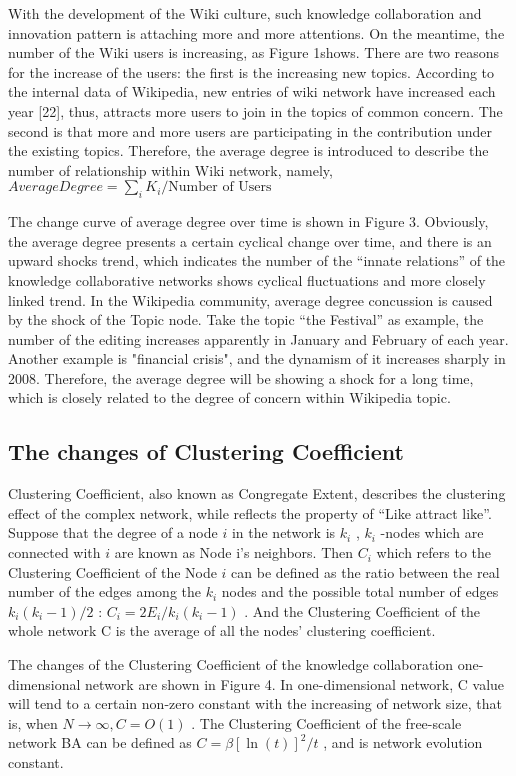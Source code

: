 \documentclass{elsarticle}
\begin{document}
With the development of the Wiki culture, such knowledge collaboration
and innovation pattern is attaching more and more attentions. On the
meantime, the number of the Wiki users is increasing, as Figure
1shows. There are two reasons for the increase of the users: the first
is the increasing new topics. According to the internal data of
Wikipedia, new entries of wiki network have increased each year [22],
thus, attracts more users to join in the topics of common concern. The
second is that more and more users are participating in the
contribution under the existing topics. Therefore, the average degree
is introduced to describe the number of relationship within Wiki
network, namely,$AverageDegree = \sum_iK_i/\text{Number of Users}$

The change curve of average degree over time is shown in Figure 3. Obviously, the average degree presents a certain cyclical change over time, and there is an upward shocks trend, which indicates the number of the “innate relations” of the knowledge collaborative networks shows cyclical fluctuations and more closely linked trend. In the Wikipedia community, average degree concussion is caused by the shock of the Topic node. Take the topic “the Festival” as example, the number of the editing increases apparently in January and February of each year. Another example is "financial crisis", and the dynamism of it increases sharply in 2008. Therefore, the average degree will be showing a shock for a long time, which is closely related to the degree of concern within Wikipedia topic.

\subsection{ The changes of Clustering Coefficient}
\label{sec:chang-clust-coeff}

Clustering Coefficient, also known as Congregate Extent, describes the
clustering effect of the complex network, while reflects the property
of “Like attract like”. Suppose that the degree of a node $i$ in the
network is $k_i$  , $k_i$  -nodes which are connected with $i$ are
known as Node i’s neighbors. Then $C_i$ which refers to the Clustering
Coefficient of the Node $i$ can be defined as the ratio between the
real number of the edges among the $k_i$  nodes and the possible total
number of edges $k_i(k_i-1)/2$ : $C_i=2E_i/k_i(k_i-1)$ . And the
Clustering Coefficient of the whole network C is the average of all
the nodes’ clustering coefficient.

The changes of the Clustering Coefficient of the knowledge
collaboration one-dimensional network are shown in Figure 4. In
one-dimensional network, C value will tend to a certain non-zero
constant with the increasing of network size, that is, when
$N\rightarrow\infty,C=O(1)$ . The Clustering Coefficient of the
free-scale network BA can be defined as $C=\beta[\ln(t)]^2/t$ , and
is network evolution constant.
\end{document}
